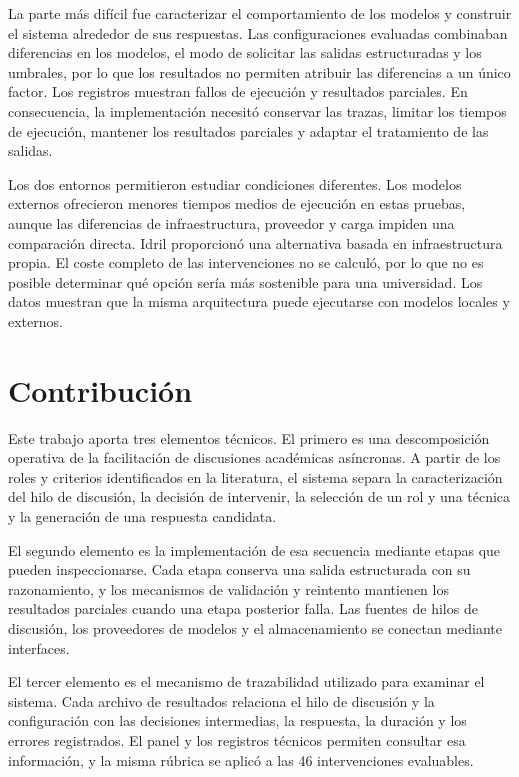 La parte más difícil fue caracterizar el comportamiento de los modelos y construir el sistema alrededor de sus respuestas. Las configuraciones evaluadas combinaban diferencias en los modelos, el modo de solicitar las salidas estructuradas y los umbrales, por lo que los resultados no permiten atribuir las diferencias a un único factor. Los registros muestran fallos de ejecución y resultados parciales. En consecuencia, la implementación necesitó conservar las trazas, limitar los tiempos de ejecución, mantener los resultados parciales y adaptar el tratamiento de las salidas.

Los dos entornos permitieron estudiar condiciones diferentes. Los modelos externos ofrecieron menores tiempos medios de ejecución en estas pruebas, aunque las diferencias de infraestructura, proveedor y carga impiden una comparación directa. Idril proporcionó una alternativa basada en infraestructura propia. El coste completo de las intervenciones no se calculó, por lo que no es posible determinar qué opción sería más sostenible para una universidad. Los datos muestran que la misma arquitectura puede ejecutarse con modelos locales y externos.

\section{Contribución}

Este trabajo aporta tres elementos técnicos. El primero es una descomposición operativa de la facilitación de discusiones académicas asíncronas. A partir de los roles y criterios identificados en la literatura, el sistema separa la caracterización del hilo de discusión, la decisión de intervenir, la selección de un rol y una técnica y la generación de una respuesta candidata.

El segundo elemento es la implementación de esa secuencia mediante etapas que pueden inspeccionarse. Cada etapa conserva una salida estructurada con su razonamiento, y los mecanismos de validación y reintento mantienen los resultados parciales cuando una etapa posterior falla. Las fuentes de hilos de discusión, los proveedores de modelos y el almacenamiento se conectan mediante interfaces.

El tercer elemento es el mecanismo de trazabilidad utilizado para examinar el sistema. Cada archivo de resultados relaciona el hilo de discusión y la configuración con las decisiones intermedias, la respuesta, la duración y los errores registrados. El panel y los registros técnicos permiten consultar esa información, y la misma rúbrica se aplicó a las 46 intervenciones evaluables.

